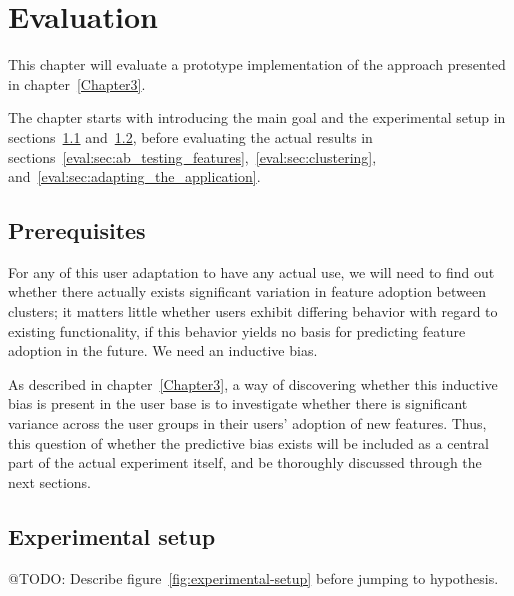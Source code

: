 \chapter{Evaluation}

\label{Chapter4}


This chapter will evaluate a prototype implementation of the approach presented in chapter~\ref{Chapter3}.

The chapter starts with introducing the main goal and the experimental setup in sections~\ref{eval:sec:prerequisites} and~\ref{eval:sec:experimental_setup},
before evaluating the actual results in sections~\ref{eval:sec:ab_testing_features},~\ref{eval:sec:clustering}, and~\ref{eval:sec:adapting_the_application}.

\section{Prerequisites} %
\label{eval:sec:prerequisites}

For any of this user adaptation to have any actual use, we will need to find out whether there actually exists significant variation in feature adoption between clusters; it matters little whether users exhibit differing behavior with regard to existing functionality, if this behavior yields no basis for predicting feature adoption in the future. We need an inductive bias.

As described in chapter~\ref{Chapter3}, a way of discovering whether this inductive bias is present in the user base is to investigate whether there is significant variance across the user groups in their users' adoption of new features. Thus, this question of whether the predictive bias exists will be included as a central part of the actual experiment itself, and be thoroughly discussed through the next sections.


\section{Experimental setup} %
\label{eval:sec:experimental_setup}

@TODO: Describe figure~\ref{fig:experimental-setup} before jumping to hypothesis.

